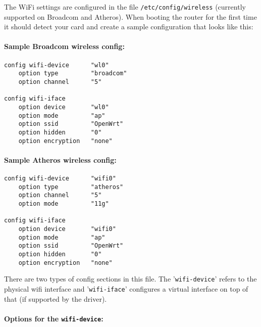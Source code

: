 The WiFi settings are configured in the file \texttt{/etc/config/wireless}
(currently supported on Broadcom and Atheros). When booting the router for the first time
it should detect your card and create a sample configuration that looks like this:

\paragraph{Sample Broadcom wireless config:}

\begin{Verbatim}
config wifi-device      "wl0"
    option type         "broadcom"
    option channel      "5"

config wifi-iface
    option device       "wl0"
    option mode         "ap"
    option ssid         "OpenWrt"
    option hidden       "0"
    option encryption   "none"
\end{Verbatim}

\paragraph{Sample Atheros wireless config:}

\begin{Verbatim}
config wifi-device      "wifi0"
    option type         "atheros"
    option channel      "5"
	option mode  		"11g"

config wifi-iface
    option device       "wifi0"
    option mode         "ap"
    option ssid         "OpenWrt"
    option hidden       "0"
    option encryption   "none"
\end{Verbatim}

There are two types of config sections in this file. The '\texttt{wifi-device}' refers to
the physical wifi interface and '\texttt{wifi-iface}' configures a virtual interface on top
of that (if supported by the driver).

\paragraph{Options for the \texttt{wifi-device}:}


